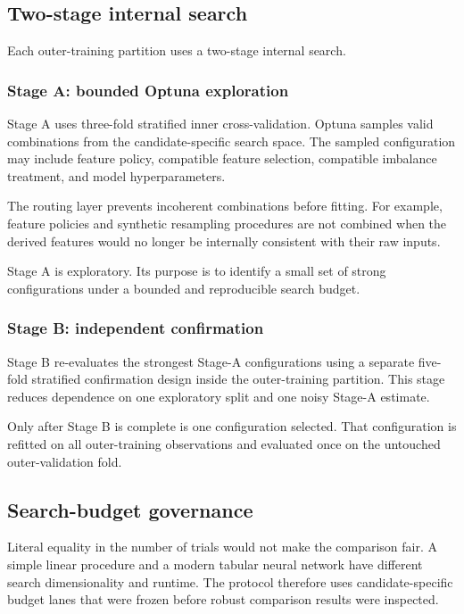 \subsection{Two-stage internal search}

Each outer-training partition uses a two-stage internal search.

\subsubsection{Stage A: bounded Optuna exploration}

Stage A uses three-fold stratified inner cross-validation. Optuna samples valid combinations from the candidate-specific search space. The sampled configuration may include feature policy, compatible feature selection, compatible imbalance treatment, and model hyperparameters.

The routing layer prevents incoherent combinations before fitting. For example, feature policies and synthetic resampling procedures are not combined when the derived features would no longer be internally consistent with their raw inputs.

Stage A is exploratory. Its purpose is to identify a small set of strong configurations under a bounded and reproducible search budget.

\subsubsection{Stage B: independent confirmation}

Stage B re-evaluates the strongest Stage-A configurations using a separate five-fold stratified confirmation design inside the outer-training partition. This stage reduces dependence on one exploratory split and one noisy Stage-A estimate.

Only after Stage B is complete is one configuration selected. That configuration is refitted on all outer-training observations and evaluated once on the untouched outer-validation fold.

\subsection{Search-budget governance}

Literal equality in the number of trials would not make the comparison fair. A simple linear procedure and a modern tabular neural network have different search dimensionality and runtime. The protocol therefore uses candidate-specific budget lanes that were frozen before robust comparison results were inspected.


